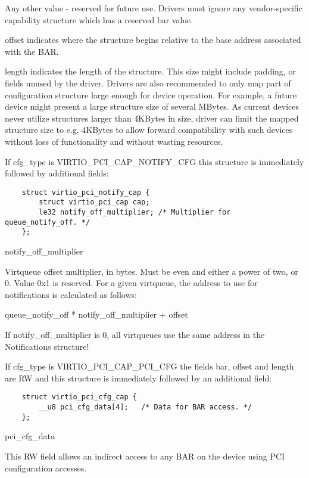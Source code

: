         Any other value - reserved for future use. Drivers must
        ignore any vendor-specific capability structure which has
        a reserved bar value.

offset
        indicates where the structure begins relative to the base address associated
        with the BAR.

length
        indicates the length of the structure.
        This size might include padding, or fields unused by the driver.
        Drivers are also recommended to only map part of configuration structure
        large enough for device operation.
        For example, a future device might present a large structure size of several
        MBytes.
        As current devices never utilize structures larger than 4KBytes in size,
        driver can limit the mapped structure size to e.g.
        4KBytes to allow forward compatibility with such devices without loss of
        functionality and without wasting resources.


If cfg_type is VIRTIO_PCI_CAP_NOTIFY_CFG this structure is immediately followed
by additional fields:

\begin{lstlisting}
	struct virtio_pci_notify_cap {
		struct virtio_pci_cap cap;
		le32 notify_off_multiplier;	/* Multiplier for queue_notify_off. */
	};
\end{lstlisting}

notify_off_multiplier

        Virtqueue offset multiplier, in bytes. Must be even and either a power of two, or 0.
        Value 0x1 is reserved.
        For a given virtqueue, the address to use for notifications is calculated as follows:

        queue_notify_off * notify_off_multiplier + offset

        If notify_off_multiplier is 0, all virtqueues use the same address in
        the Notifications structure!

If cfg_type is VIRTIO_PCI_CAP_PCI_CFG the fields bar, offset and length are RW
and this structure is immediately followed by an additional field:

\begin{lstlisting}
	struct virtio_pci_cfg_cap {
		__u8 pci_cfg_data[4];	/* Data for BAR access. */
	};
\end{lstlisting}

pci_cfg_data

        This RW field allows an indirect access to any BAR on the
        device using PCI configuration accesses.

